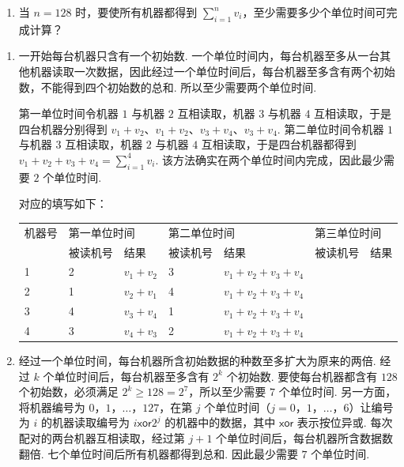 \begin{problem}
\begin{enumerate}
\item 当 \(n=128\) 时，要使所有机器都得到 \(\sum_{i=1}^{n}v_i\)，至少需要多少个单位时间可完成计算？
\end{enumerate}

\begin{solution}
\begin{enumerate}
    \item 一开始每台机器只含有一个初始数. 一个单位时间内，每台机器至多从一台其他机器读取一次数据，因此经过一个单位时间后，每台机器至多含有两个初始数，不能得到四个初始数的总和. 所以至少需要两个单位时间.

第一单位时间令机器 \(1\) 与机器 \(2\) 互相读取，机器 \(3\) 与机器 \(4\) 互相读取，于是四台机器分别得到 \(v_1+v_2\)、\(v_1+v_2\)、\(v_3+v_4\)、\(v_3+v_4\). 第二单位时间令机器 \(1\) 与机器 \(3\) 互相读取，机器 \(2\) 与机器 \(4\) 互相读取，于是四台机器都得到
\(v_1+v_2+v_3+v_4=\sum_{i=1}^{4}v_i\). 该方法确实在两个单位时间内完成，因此最少需要 \(2\) 个单位时间.

对应的填写如下：
\begin{center}
\begin{tabular}{l|ll|ll|ll}
机器号 & \multicolumn{2}{l|}{第一单位时间} & \multicolumn{2}{l|}{第二单位时间} & \multicolumn{2}{l}{第三单位时间} \\
 & 被读机号 & 结果 & 被读机号 & 结果 & 被读机号 & 结果 \\
\hline
1 & 2 & \(v_1+v_2\) & 3 & \(v_1+v_2+v_3+v_4\) & & \\
2 & 1 & \(v_2+v_1\) & 4 & \(v_1+v_2+v_3+v_4\) & & \\
3 & 4 & \(v_3+v_4\) & 1 & \(v_1+v_2+v_3+v_4\) & & \\
4 & 3 & \(v_4+v_3\) & 2 & \(v_1+v_2+v_3+v_4\) & &
\end{tabular}
\end{center}

\item 经过一个单位时间，每台机器所含初始数据的种数至多扩大为原来的两倍. 经过 \(k\) 个单位时间后，每台机器至多含有 \(2^{k}\) 个初始数. 要使每台机器都含有 \(128\) 个初始数，必须满足 \(2^{k}\geqslant128=2^{7}\)，所以至少需要 \(7\) 个单位时间. 另一方面，将机器编号为 \(0\)，\(1\)，\(\ldots\)，\(127\)，在第 \(j\) 个单位时间（\(j=0\)，\(1\)，\(\ldots\)，\(6\)）让编号为 \(i\) 的机器读取编号为 \(i\mathbin{\mathsf{xor}}2^{j}\) 的机器中的数据，其中 \(\mathsf{xor}\) 表示按位异或. 每次配对的两台机器互相读取，经过第 \(j+1\) 个单位时间后，每台机器所含数据数翻倍. 七个单位时间后所有机器都得到总和. 因此最少需要 \(7\) 个单位时间.
\end{enumerate}
\end{solution}
\end{problem}

